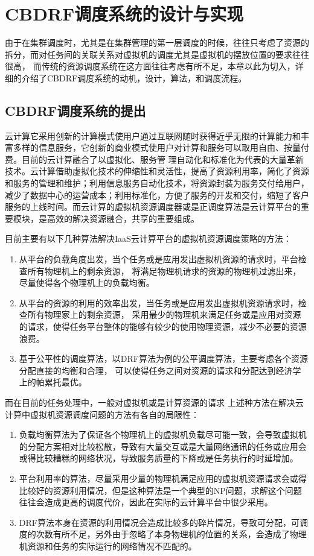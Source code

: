 \chapter{CBDRF调度系统的设计与实现}
\label{cha:frontmatter}
由于在集群调度时，尤其是在集群管理的第一层调度的时候，往往只考虑了资源的拆分，而对任务间的关联关系对虚拟机的调度尤其是虚拟机的摆放位置的要求往往很高，
而传统的资源调度系统在这方面往往考虑有所不足，本章以此为切入，详细的介绍了CBDRF调度系统的动机，设计，算法，和调度流程。

\section{CBDRF调度系统的提出}
云计算它采用创新的计算模式使用户通过互联网随时获得近乎无限的计算能力和丰富多样的信息服务，它创新的商业模式使用户对计算和服务可以取用自由、按量付费。目前的云计算融合了以虚拟化、服务管 理自动化和标准化为代表的大量革新技术。云计算借助虚拟化技术的伸缩性和灵活性，提高了资源利用率，简化了资源和服务的管理和维护；利用信息服务自动化技术，将资源封装为服务交付给用户，减少了数据中心的运营成本；利用标准化，方便了服务的开发和交付，缩短了客户服务的上线时间。而云计算的虚拟机资源调度器或是正调度算法是云计算平台的重要模块，是高效的解决资源融合，共享的重要组成。

目前主要有以下几种算法解决IaaS云计算平台的虚拟机资源调度策略的方法：
 \begin{enumerate}
\item 从平台的负载角度出发，当个任务或是应用发出虚拟机资源的请求时，平台检查所有物理机上的剩余资源，
将满足物理机请求的资源的物理机过滤出来，尽量使得各个物理机上的负载均衡。
\item 从平台的资源的利用的效率出发，当任务或是应用发出虚拟机资源请求时，检查所有物理家上的剩余资源，
采用最少的物理机来满足任务或是应用对资源的请求，使得任务平台整体的能够有较少的使用物理资源，减少不必要的资源浪费。
\item 基于公平性的调度算法，以DRF算法为例的公平调度算法，主要考虑各个资源分配直接的均衡和合理，
可以使得任务之间对资源的请求和分配达到经济学上的帕累托最优。
\end{enumerate}

而在目前的任务处理中，一般对虚拟机或是计算资源的请求
上述种方法在解决云计算中虚拟机资源调度问题的方法有各自的局限性：
\begin{enumerate}
\item 负载均衡算法为了保证各个物理机上的虚拟机负载尽可能一致，会导致虚拟机的分配方案相对比较松散，导致有大量交互或是大量网络通讯的任务或应用会或得比较糟糕的网络状况，导致服务质量的下降或是任务执行的时延增加。
\item 平台利用率的算法，尽量采用少量的物理机满足应用的虚拟机资源请求会或得比较好的资源利用情况，但是这种算法是一个典型的NP问题，求解这个问题往往会造成更高的调度代价，因此在实际的云计算平台中很少采用。
\item DRF算法本身在资源的利用情况会造成比较多的碎片情况，导致可分配，可调度的次数有所不足，另外由于忽略了本身物理机的位置的关系，会造成了物理机资源和任务的实际运行的网络情况不匹配的。
\end{enumerate}


